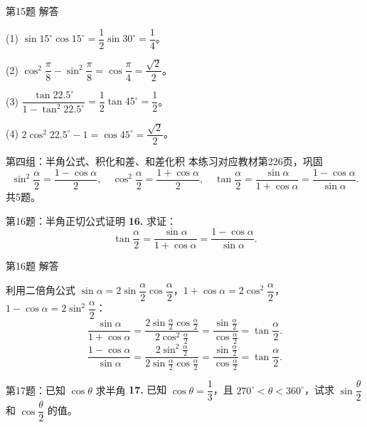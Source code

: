 \documentclass[10pt,aspectratio=169,serif]{beamer}
\begin{document}
\begin{frame}[t]{第15题 解答}
\begin{tcolorbox}[colback=orange!10,colframe=orange,title=\textbf{解}]
(1) $\sin15^\circ\cos15^\circ=\dfrac12\sin30^\circ=\dfrac14$。

(2) $\cos^2\dfrac{\pi}{8}-\sin^2\dfrac{\pi}{8}=\cos\dfrac{\pi}{4}=\dfrac{\sqrt2}{2}$。

(3) $\dfrac{\tan22.5^\circ}{1-\tan^2 22.5^\circ}=\dfrac12\tan45^\circ=\dfrac12$。

(4) $2\cos^2 22.5^\circ-1=\cos45^\circ=\dfrac{\sqrt2}{2}$。
\end{tcolorbox}
\end{frame}

\begin{frame}{第四组：半角公式、积化和差、和差化积}
本练习对应教材第226页，巩固
\[
\sin^2\frac{\alpha}{2}=\frac{1-\cos\alpha}{2},\quad
\cos^2\frac{\alpha}{2}=\frac{1+\cos\alpha}{2},\quad
\tan\frac{\alpha}{2}=\frac{\sin\alpha}{1+\cos\alpha}=\frac{1-\cos\alpha}{\sin\alpha}.
\]
共5题。
\end{frame}

\begin{frame}[t]{第16题：半角正切公式证明}
\textbf{16.} 求证：
\[
\tan\frac{\alpha}{2}=\frac{\sin\alpha}{1+\cos\alpha}=\frac{1-\cos\alpha}{\sin\alpha}.
\]
\end{frame}

\begin{frame}[t]{第16题 解答}
\begin{tcolorbox}[colback=orange!10,colframe=orange,title=\textbf{证明}]
利用二倍角公式 $\sin\alpha=2\sin\dfrac{\alpha}{2}\cos\dfrac{\alpha}{2}$，$1+\cos\alpha=2\cos^2\dfrac{\alpha}{2}$，$1-\cos\alpha=2\sin^2\dfrac{\alpha}{2}$：
\[
\frac{\sin\alpha}{1+\cos\alpha}=\frac{2\sin\frac{\alpha}{2}\cos\frac{\alpha}{2}}{2\cos^2\frac{\alpha}{2}}=\frac{\sin\frac{\alpha}{2}}{\cos\frac{\alpha}{2}}=\tan\frac{\alpha}{2}.
\]
\[
\frac{1-\cos\alpha}{\sin\alpha}=\frac{2\sin^2\frac{\alpha}{2}}{2\sin\frac{\alpha}{2}\cos\frac{\alpha}{2}}=\frac{\sin\frac{\alpha}{2}}{\cos\frac{\alpha}{2}}=\tan\frac{\alpha}{2}.
\]
\end{tcolorbox}
\end{frame}

\begin{frame}[t]{第17题：已知 $\cos\theta$ 求半角}
\textbf{17.} 已知 $\cos\theta=\dfrac13$，且 $270^\circ<\theta<360^\circ$，试求 $\sin\dfrac{\theta}{2}$ 和 $\cos\dfrac{\theta}{2}$ 的值。
\end{frame}
\end{document}
